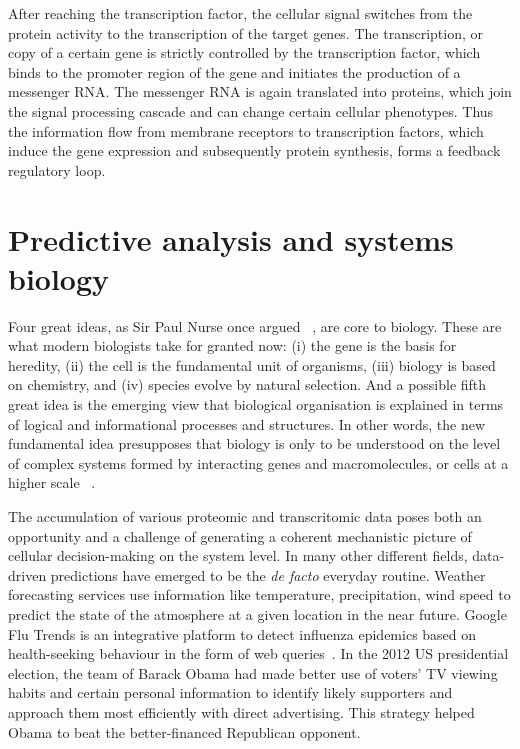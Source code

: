 After reaching the transcription factor, 
the cellular signal switches from the
protein activity to the transcription of the target genes. The transcription,
or copy of a certain gene is strictly controlled by the transcription factor,
which binds to the promoter region of the gene and initiates the production
of a messenger RNA. The messenger RNA is again translated into proteins,
which join the signal processing cascade and can change certain cellular 
phenotypes. Thus the information flow from membrane receptors to transcription
factors, which induce the gene expression and subsequently protein synthesis, 
forms a feedback regulatory loop.

\section{Predictive analysis and systems biology}
Four great ideas, as Sir Paul Nurse once argued~%
\citep{Nurse2003}, are core to biology. These are what
modern biologists take for granted now: (i) the gene is the basis for heredity, (ii) the cell is the fundamental unit of organisms, (iii) biology is based on chemistry, and (iv) species evolve by natural selection. And a possible fifth great 
idea is the emerging view that biological organisation is explained in terms of logical
and informational processes and structures. 
In other words, 
the new fundamental idea presupposes that biology is only to be 
understood
on the level of complex systems formed by interacting genes and macromolecules, or cells at a higher scale~%
\citep{Vidal2009}.

The accumulation of various proteomic and transcritomic
data poses both an opportunity and a challenge of 
generating a coherent 
mechanistic picture of cellular decision-making on the 
system level. In many
other different fields, data-driven predictions have 
emerged to be the \emph{de facto} everyday routine. Weather
forecasting services use information like temperature, 
precipitation, wind speed to predict the state of the 
atmosphere at a given location in the near future. Google
Flu Trends is an integrative platform to detect influenza
epidemics based on health-seeking behaviour in the form of 
web queries~\citep{Ginsberg2009}. In the 2012 US presidential
election, the team of Barack Obama had made better use of 
voters' TV viewing habits and certain personal information 
to identify likely supporters and
approach them most efficiently with direct advertising. 
This strategy helped Obama to beat the better-financed
Republican opponent.


